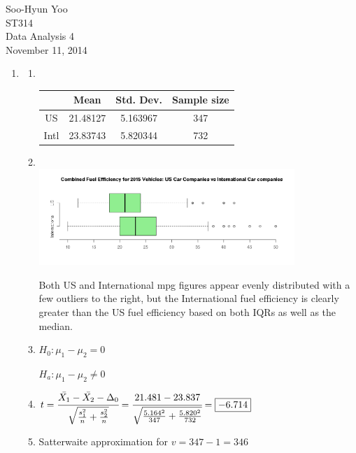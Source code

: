 \documentclass[12pt,letterpaper]{article}
\begin{document}
Soo-Hyun Yoo \\
ST314 \\
Data Analysis 4 \\
November 11, 2014

\begin{enumerate}
  \item
    \begin{enumerate}
      \item \hfill\\
        \begin{table}[!h]
          \centering
          \begin{tabular}{|c|c|c|c|} \hline
                 & Mean & Std. Dev. & Sample size \\ \hline
            US   & 21.48127 & 5.163967 & 347 \\ \hline
            Intl & 23.83743 & 5.820344 & 732 \\ \hline
          \end{tabular}
        \end{table}

      \item \hfill\\ \includegraphics[width=0.8\textwidth]{1b.png}

        Both US and International mpg figures appear evenly distributed with
        a few outliers to the right, but the International fuel efficiency is
        clearly greater than the US fuel efficiency based on both IQRs as well
        as the median.

      \item $H_0: \mu_1 - \mu_2 = 0$

        $H_a: \mu_1 - \mu_2 \ne 0$

      \item $t = \cfrac{\bar{X_1} - \bar{X_2} - \Delta_0}{\sqrt{\frac{s_1^2}{n}+\frac{s_2^2}{n}}} = \cfrac{21.481-23.837}{\sqrt{\frac{5.164^2}{347}+\frac{5.820^2}{732}}} = \boxed{-6.714}$

      \item Satterwaite approximation for $v = 347 - 1 = \boxed{346}$


\end{enumerate}
\end{enumerate}
\end{document}
